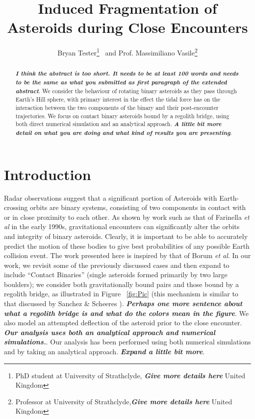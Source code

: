 \documentclass[letterpaper, preprint, paper,11pt]{AAS}	%
\begin{document}
\title{\textsf{\textbf{Induced Fragmentation of Asteroids during Close Encounters}}}
\author{\textsf{Bryan Tester}\thanks{PhD student at University of Strathclyde, \textbf{\emph{Give more details here}} United Kingdom}
\ and \textsf{Prof. Massimiliano Vasile}\thanks{Professor at University of Strathclyde,\textbf{\emph{Give more details here}} United Kingdom}}

\maketitle{} 		


\begin{abstract}
\textbf{\emph{I think the abstract is too short. It needs to be at least 100 words and needs to be the same as what you submitted as first paragraph of the extended abstract}}. We consider the behaviour of rotating binary asteroids as they pass through Earth's Hill sphere, with primary interest in the effect the tidal force has on the interaction between the two components of the binary and their post-encounter trajectories. We focus on contact binary asteroids bound by a regolith bridge, using both direct numerical simulation and an analytical approach. \textbf{\emph{A little bit more detail on what you are doing and what kind of results you are presenting}}.
\end{abstract}

\section{Introduction}
Radar observations suggest that a significant portion of Asteroids with Earth-crossing orbits are binary systems, consisting of two components in contact with or in close proximity to each other. As shown by work such as that of Farinella \textit{et al} \cite{binaryevo} in the early 1990s, gravitational encounters can significantly alter the orbits and integrity of binary asteroids. Clearly, it is important to be able to accurately predict the motion of these bodies to give best probabilities of any possible Earth collision event. The work presented here is inspired by that of Borum \textit{et al}\cite{exchange}. In our work, we revisit some of the previously discussed cases and then expand to include “Contact Binaries” (single asteroids formed primarily by two large boulders); we consider both gravitationally bound pairs and those bound by a regolith bridge, as illustrated in Figure ~\ref{fig:Pic} (this mechanism is similar to that discussed by Sanchez \& Scheeres \cite{dustbound}). \textbf{\emph{Perhaps one more sentence about what a regolith bridge is and what do the colors mean in the figure}}. We also model an attempted deflection of the asteroid prior to the close encounter. \textbf{\emph{Our analysis uses both an analytical approach and numerical simulations.}}. Our analysis has been performed using both numerical simulations and by taking an analytical approach.
\textbf{\emph{Expand a little bit more}}.
\end{document}
